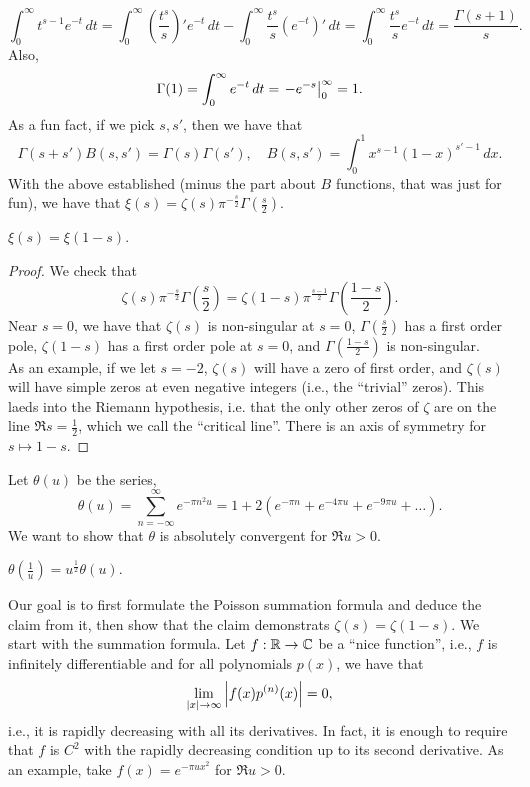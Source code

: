 \[ \int_0^\infty t^{s-1} e^{-t} \, dt = \int_0^\infty \left(\frac{t^s}{s}\right)' e^{-t} \, dt - \int_0^\infty \frac{t^s}{s} (e^{-t})' \, dt = \int_0^\infty \frac{t^s}{s} e^{-t} \, dt = \frac{\Gamma(s+1)}{s}. \]
Also,
\[ \Gamma(1) = \int_0^\infty e^{-t} \, dt = \left.-e^{-s}\right\rvert_{0}^{\infty} = 1. \]
As a fun fact, if we pick $s, s'$, then we have that
\[ \Gamma(s + s') B(s, s') = \Gamma(s) \Gamma(s'), \quad B(s, s') = \int_0^1 x^{s-1} (1 - x)^{s' - 1} \, dx. \]
With the above established (minus the part about $B$ functions, that was just for fun), we have that $\xi(s) = \zeta(s) \pi^{-\frac{s}{2}} \Gamma(\frac{s}{2})$.
\begin{theorem}
    $\xi(s) = \xi(1 - s)$.
\end{theorem}
\begin{proof}
    We check that
    \[ \zeta(s) \pi^{-\frac{s}{2}} \Gamma\left(\frac{s}{2}\right) = \zeta(1 - s) \pi^{\frac{s-1}{2}} \Gamma\left(\frac{1-s}{2}\right). \]
    Near $s = 0$, we have that $\zeta(s)$ is non-singular at $s = 0$, $\Gamma(\frac{s}{2})$ has a first order pole, $\zeta(1 - s)$ has a first order pole at $s = 0$, and $\Gamma(\frac{1-s}{2})$ is non-singular. 
    \\[8pt]
    As an example, if we let $s = -2$, $\zeta(s)$ will have a zero of first order, and $\zeta(s)$ will have simple zeros at even negative integers (i.e., the ``trivial'' zeros). This laeds into the Riemann hypothesis, i.e. that the only other zeros of $\zeta$ are on the line $\Re s = \frac{1}{2}$, which we call the ``critical line''. There is an axis of symmetry for $s \mapsto 1 - s$.
\end{proof}
\noindent Let $\theta(u)$ be the series,
\[ \theta(u) = \sum_{n=-\infty}^\infty e^{-\pi n^2 u} = 1 + 2(e^{-\pi n} + e^{-4\pi u} + e^{-9\pi u} + \dots). \]
We want to show that $\theta$ is absolutely convergent for $\Re u > 0$.
\begin{claim}
    $\theta(\frac{1}{u}) = u^\frac{1}{2} \theta(u)$.
\end{claim}
\noindent Our goal is to first formulate the Poisson summation formula and deduce the claim from it, then show that the claim demonstrats $\zeta(s) = \zeta(1-s)$. We start with the summation formula. Let $f : \mathbb R \to \mathbb C$ be a ``nice function'', i.e., $f$ is infinitely differentiable and for all polynomials $p(x)$, we have that
\[ \lim_{\left\lvert x \right\rvert \to \infty} \left\lvert f(x) p^{(n)}(x) \right\rvert = 0, \]
i.e., it is rapidly decreasing with all its derivatives. In fact, it is enough to require that $f$ is $C^2$ with the rapidly decreasing condition up to its second derivative. As an example, take $f(x) = e^{-\pi u x^2}$ for $\Re u > 0$.
